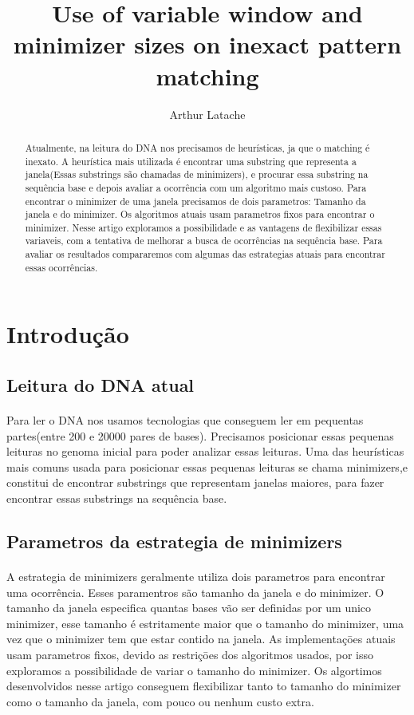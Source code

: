 \documentclass{article}
\begin{document}
\title{Use of variable window and minimizer sizes on inexact pattern matching}
\author{Arthur Latache}

\maketitle
\begin{abstract}
Atualmente, na leitura do DNA nos precisamos de heurísticas, ja que o matching é inexato. A heurística mais utilizada é encontrar uma substring que representa a janela(Essas substrings são chamadas de minimizers), e procurar essa substring na sequência base e depois avaliar a ocorrência com um algoritmo mais custoso. Para encontrar o minimizer de uma janela precisamos de dois parametros: Tamanho da janela e do minimizer. Os algoritmos atuais usam parametros fixos para encontrar o minimizer. Nesse artigo exploramos a possibilidade e as vantagens de flexibilizar essas variaveis, com a tentativa de melhorar a busca de ocorrências na sequência base. Para avaliar os resultados compararemos com algumas das estrategias atuais para encontrar essas ocorrências.
\end{abstract}
\section{Introdução}
\subsection{Leitura do DNA atual}
\paragraph{}{Para ler o DNA nos usamos tecnologias que conseguem ler em pequentas partes(entre 200 e 20000 pares de bases). Precisamos posicionar essas pequenas leituras no genoma inicial para poder analizar essas leituras. Uma das heurísticas mais comuns usada para posicionar essas pequenas leituras se chama minimizers,e constitui de encontrar substrings que representam janelas maiores, para fazer encontrar essas substrings na sequência base.}
\subsection{Parametros da estrategia de minimizers}
\paragraph{}{A estrategia de minimizers geralmente utiliza dois parametros para encontrar uma ocorrência. Esses paramentros são tamanho da janela e do minimizer. O tamanho da janela especifica quantas bases vão ser definidas por um unico minimizer, esse tamanho é estritamente maior que o tamanho do minimizer, uma vez que o minimizer tem que estar contido na janela. As implementaçōes atuais usam parametros fixos, devido as restriçōes dos algoritmos usados, por isso exploramos a possibilidade de variar o tamanho do minimizer. Os algortimos desenvolvidos nesse artigo conseguem flexibilizar tanto to tamanho do minimizer como o tamanho da janela, com pouco ou nenhum custo extra.}
\end{document}
